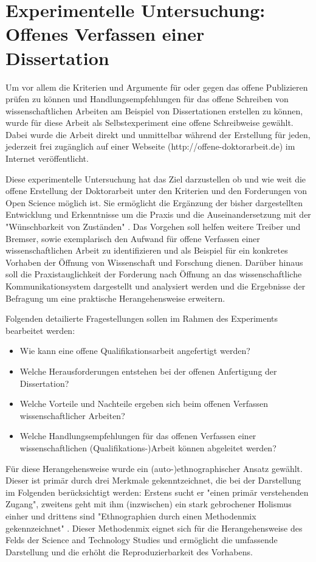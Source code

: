 \chapter{Experimentelle Untersuchung: Offenes Verfassen einer Dissertation}

Um vor allem die Kriterien und Argumente für oder gegen das offene Publizieren prüfen zu können und Handlungsempfehlungen für das offene Schreiben von wissenschaftlichen Arbeiten am Beispiel von Dissertationen erstellen zu können, wurde für diese Arbeit als Selbstexperiment eine offene Schreibweise gewählt. Dabei wurde die Arbeit direkt und unmittelbar während der Erstellung für jeden, jederzeit frei zugänglich auf einer Webseite (http://offene-doktorarbeit.de) im Internet veröffentlicht.

Diese experimentelle Untersuchung hat das Ziel darzustellen ob und wie weit die offene Erstellung der Doktorarbeit unter den Kriterien und den Forderungen von Open Science möglich ist. Sie ermöglicht die Ergänzung der bisher dargestellten Entwicklung und Erkenntnisse um die Praxis und die Auseinandersetzung mit der "Wünschbarkeit von Zuständen" \cite{cite:10}. Das Vorgehen soll helfen weitere Treiber und Bremser, sowie exemplarisch den Aufwand für offene Verfassen einer wissenschaftlichen Arbeit zu identifizieren und als Beispiel für ein konkretes Vorhaben der Öffnung von Wissenschaft und Forschung dienen. Darüber hinaus soll die Praxistauglichkeit der Forderung nach Öffnung an das wissenschaftliche Kommunikationsystem dargestellt und analysiert werden und die Ergebnisse der Befragung um eine praktische Herangehensweise erweitern.

Folgenden detailierte Fragestellungen sollen im Rahmen des Experiments bearbeitet werden:
\begin{itemize}
\item Wie kann eine offene Qualifikationsarbeit angefertigt werden?
\item Welche Herausforderungen entstehen bei der offenen Anfertigung der Dissertation?
\item Welche Vorteile und Nachteile ergeben sich beim offenen Verfassen wissenschaftlicher Arbeiten?
\item Welche Handlungsempfehlungen für das offenen Verfassen einer wissenschaftlichen (Qualifikations-)Arbeit können abgeleitet werden?
\end{itemize}

Für diese Herangehensweise wurde ein (auto-)ethnographischer Ansatz gewählt. Dieser ist primär durch drei Merkmale gekenntzeichnet, die bei der Darstellung im Folgenden berücksichtigt werden:  Erstens sucht er  "einen primär verstehenden Zugang", zweitens geht mit ihm (inzwischen) ein stark gebrochener Holismus einher und drittens sind "Ethnographien durch einen Methodenmix gekennzeichnet" \cite{bachmann_2011_ethnographie}. Dieser Methodenmix eignet sich für die Herangehensweise des Felds der Science and Technology Studies und ermöglicht die umfassende Darstellung und die erhöht die Reproduzierbarkeit des Vorhabens.

